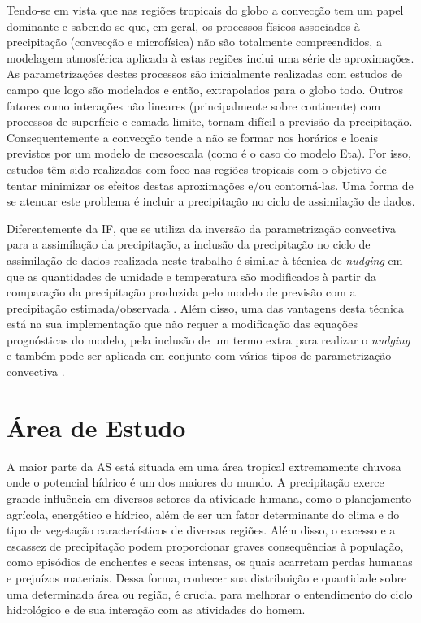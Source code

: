 Tendo-se em vista que nas regiões tropicais do globo a convecção tem um papel dominante e sabendo-se que, em geral, os processos físicos associados à precipitação (convecção e microfísica) não são totalmente compreendidos, a modelagem atmosférica aplicada à estas regiões inclui uma série de aproximações. As parametrizações destes processos são inicialmente realizadas com estudos de campo que logo são \-mo\-de\-la\-dos e então, extrapolados para o globo todo. Outros fatores como interações não lineares (principalmente sobre continente) com processos de superfície e camada \-li\-mi\-te, tornam difícil a previsão da precipitação. Consequentemente a convecção tende a não se formar nos horários e locais previstos por um \-mo\-de\-lo de mesoescala (como é o caso do modelo Eta). Por isso, estudos têm sido realizados com foco nas regiões tropicais com o objetivo de tentar minimizar os efeitos destas aproximações e/ou contorná-las. Uma forma de se atenuar este problema é incluir a precipitação no ciclo de assimilação de dados.

Diferentemente da IF, que se utiliza da inversão da parametrização convectiva para a assimilação da precipitação, a inclusão da precipitação no ciclo de assimilação de dados realizada neste trabalho é similar à técnica de \textit{nudging} em que as quantidades de umidade e temperatura são modificados à partir da comparação da precipitação produzida pelo modelo de previsão com a precipitação estimada/observada \cite{carrbaldwin91}. Além disso, uma das vantagens desta técnica está na sua implementação que não requer a modificação das equações prognósticas do modelo, pela inclusão de um termo extra para realizar o \textit{nudging} e também pode ser aplicada em conjunto com vários tipos de parametrização convectiva \cite{rogersetal05}.

\section{Área de Estudo}

A maior parte da AS está situada em uma área tropical extremamente chuvosa onde o potencial hídrico é um dos maiores do mundo. A precipitação exerce grande influência em diversos setores da atividade humana, como o planejamento agrícola, energético e hídrico, além de ser um fator determinante do clima e do tipo de ve\-ge\-ta\-ção característicos de diversas regiões. Além disso, o excesso e a escassez de precipitação podem proporcionar graves consequências à população, como episódios de enchentes e secas intensas, os quais acarretam perdas humanas e prejuízos materiais. Dessa forma, conhecer sua distribuição e quantidade sobre uma determinada área ou região, é crucial para melhorar o entendimento do ciclo hidrológico e de sua interação com as atividades do homem.

